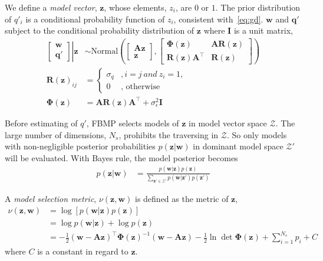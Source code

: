 We define a \textit{model vector}, $\bm{z}$, whose elements, $z_i$, are $0$ or $1$. The prior distribution of $q'_i$ is a conditional probability function of $z_i$, consistent with~\eqref{eq:gd}. $\bm{w}$ and $\bm{q}'$ subject to the conditional probability distribution of $\bm{z}$ where $\bm{I}$ is a unit matrix,
\begin{equation}
\begin{aligned}
    \left.
    \begin{bmatrix}
        \bm{w} \\
        \bm{q}'
    \end{bmatrix}
    \right\vert\bm{z}
    &\sim \mathrm{Normal}\left(
    \begin{bmatrix}
        \bm{A}\bm{z} \\
        \bm{z}
    \end{bmatrix}, 
    \begin{bmatrix}
        \bm{\Phi}(\bm{z}) & \bm{A}\bm{R}(\bm{z}) \\
        \bm{R}(\bm{z})\bm{A}^\top & \bm{R}(\bm{z})
    \end{bmatrix}
    \right) \\
    \bm{R}(\bm{z})_{ij} &= \left\{
    \begin{array}{ll}
      \sigma_q & , i=j\ and\ z_i = 1, \\
      0 & \mbox{, otherwise}
    \end{array}
    \right. \\
    \bm{\Phi}(\bm{z}) &= \bm{A}\bm{R}(\bm{z})\bm{A}^\top+\sigma_\epsilon^2\bm{I}
\end{aligned}
\end{equation}

Before estimating of $q'$, FBMP selects models of $\bm{z}$ in model vector space $\mathcal{Z}$. The large number of dimensions, $N_s$, prohibits the traversing in $\mathcal{Z}$. So only models with non-negligible posterior probabilities $p(\bm{z}|\bm{w})$ in dominant model space $\mathcal{Z}'$ will be evaluated. With Bayes rule, the model posterior becomes
\begin{align}
    p(\bm{z}|\bm{w}) &= \frac{p(\bm{w}|\bm{z})p(\bm{z})}{\sum_{\bm{z}'\in\mathcal{Z}'}p(\bm{w}|\bm{z'})p(\bm{z'})}
\end{align}

A \textit{model selection metric}, $\nu(\bm{z},\bm{w})$ is defined as the metric of $\bm{z}$, 
\begin{equation}
    \begin{aligned}
        \nu(\bm{z},\bm{w}) &= \log[p(\bm{w}|\bm{z})p(\bm{z})] \\
        &= \log p(\bm{w}|\bm{z}) + \log p(\bm{z}) \\
        &= -\frac{1}{2}(\bm{w}-\bm{A}\bm{z})^\top\bm{\Phi}(\bm{z})^{-1}(\bm{w}-\bm{A}\bm{z})-\frac{1}{2}\ln\det\bm{\Phi}(\bm{z})+\sum_{i=1}^{N_s}p_i+C
    \end{aligned}
\end{equation}
where $C$ is a constant in regard to $\bm{z}$. 

